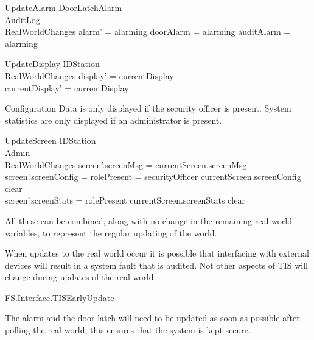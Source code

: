 \begin{schema}{UpdateAlarm}
	\Xi DoorLatchAlarm
\\      AuditLog
\\	RealWorldChanges
\where
        alarm' = alarming \iff doorAlarm = alarming \lor auditAlarm = alarming 
\end{schema}

\begin{schema}{UpdateDisplay}
	\Delta IDStation
\\	RealWorldChanges
\where
	display' = currentDisplay
\\      currentDisplay' = currentDisplay
\end{schema}

Configuration Data is only displayed if the security officer is
present.  System statistics are only displayed if an administrator is present.

\begin{schema}{UpdateScreen}
        \Delta IDStation
\\      \Xi Admin
\\      RealWorldChanges
\where
           screen'.screenMsg = currentScreen.screenMsg
\\           screen'.screenConfig = \IF \The rolePresent =
securityOfficer \THEN currentScreen.screenConfig \ELSE clear 
\\            screen'.screenStats = \IF rolePresent \neq \Nil
\THEN currentScreen.screenStats \ELSE clear
\end{schema}

All these can be combined, along with no change in the remaining
real world variables,
to represent the regular updating of the world. 
 
When updates to the real world occur it is possible that interfacing
with external devices will result in a system fault that is
audited. Not other aspects of TIS will change during updates of the
real world.

\begin{traceunit}{FS.Interface.TISEarlyUpdate}
\end{traceunit}


The alarm and the door latch will need to be updated as soon as
possible after polling the real world, this ensures that the system is
kept secure.

